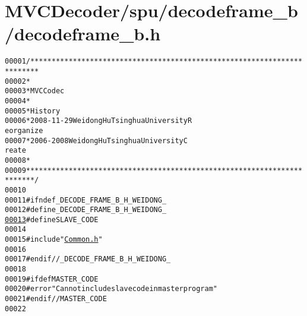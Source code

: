 \hypertarget{decodeframe__b_8h_source}{
\section{MVCDecoder/spu/decodeframe\_\-b/decodeframe\_\-b.h}
}


\begin{footnotesize}\begin{alltt}
00001 \textcolor{comment}{/************************************************************************}
00002 \textcolor{comment}{ *}
00003 \textcolor{comment}{ * MVC Codec}
00004 \textcolor{comment}{ * }
00005 \textcolor{comment}{ * History}
00006 \textcolor{comment}{ * 2008-11-29           Weidong Hu              Tsinghua University             R
      eorganize}
00007 \textcolor{comment}{ * 2006-2008            Weidong Hu              Tsinghua University             C
      reate}
00008 \textcolor{comment}{ * }
00009 \textcolor{comment}{ ************************************************************************/}
00010 
00011 \textcolor{preprocessor}{#ifndef \_DECODE\_FRAME\_B\_H\_WEIDONG\_}
00012 \textcolor{preprocessor}{}\textcolor{preprocessor}{#define \_DECODE\_FRAME\_B\_H\_WEIDONG\_}
\hypertarget{decodeframe__b_8h_source_l00013}{}\hyperlink{decodeframe__b_8h_a995f6a4907273b8d56b6543ab1a57d17}{00013} \textcolor{preprocessor}{}\textcolor{preprocessor}{#define SLAVE\_CODE}
00014 \textcolor{preprocessor}{}
00015 \textcolor{preprocessor}{#include "\hyperlink{_common_8h}{Common.h}"}
00016 
00017 \textcolor{preprocessor}{#endif //\_DECODE\_FRAME\_B\_H\_WEIDONG\_}
00018 \textcolor{preprocessor}{}
00019 \textcolor{preprocessor}{#ifdef MASTER\_CODE}
00020 \textcolor{preprocessor}{}\textcolor{preprocessor}{#error "Can not include slave code in master program"}
00021 \textcolor{preprocessor}{}\textcolor{preprocessor}{#endif // MASTER\_CODE}
00022 \textcolor{preprocessor}{}
\end{alltt}\end{footnotesize}
